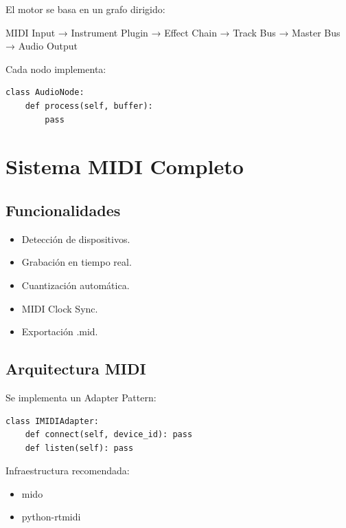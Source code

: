 \documentclass[12pt]{article}
\begin{document}
El motor se basa en un grafo dirigido:

\begin{tcolorbox}[colback=softblue,colframe=primary,title=Audio Flow]

MIDI Input → Instrument Plugin → Effect Chain → Track Bus → Master Bus → Audio Output

\end{tcolorbox}

Cada nodo implementa:

\begin{lstlisting}
class AudioNode:
    def process(self, buffer):
        pass
\end{lstlisting}

\section{Sistema MIDI Completo}

\subsection{Funcionalidades}

\begin{itemize}
    \item Detección de dispositivos.
    \item Grabación en tiempo real.
    \item Cuantización automática.
    \item MIDI Clock Sync.
    \item Exportación .mid.
\end{itemize}

\subsection{Arquitectura MIDI}

Se implementa un Adapter Pattern:

\begin{lstlisting}
class IMIDIAdapter:
    def connect(self, device_id): pass
    def listen(self): pass
\end{lstlisting}

Infraestructura recomendada:
\begin{itemize}
    \item mido
    \item python-rtmidi
\end{itemize}
\end{document}
